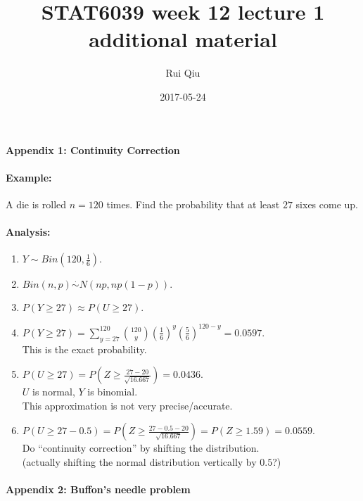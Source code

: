 \documentclass[a4paper, 11pt, twoside]{article}
\begin{document}
\title{STAT6039 week 12 lecture 1 additional material}
\author{Rui Qiu}
\date{2017-05-24}

\maketitle

\paragraph{Appendix 1: Continuity Correction}

\paragraph{Example:} A die is rolled $n=120$ times. Find the probability that at least $27$ sixes come up.

\paragraph{Analysis:}

\begin{enumerate}
	\item $Y\sim Bin(120, \frac{1}{6}).$
	\item $Bin(n, p)\overset{\cdot}{\sim} N(np, np(1-p)).$
	\item $P(Y\geq 27)\approx P(U\geq 27).$
	\item $P(Y\geq 27)=\sum^{120}_{y=27}{120 \choose y}\left(\frac{1}{6}\right)^y\left(\frac{5}{6}\right)^{120-y}=0.0597.$\\
	This is the exact probability.
	\item $P(U\geq 27)=P\left(Z\geq \frac{27-20}{\sqrt{16.667}}\right)=0.0436.$\\
	$U$ is normal, $Y$ is binomial.\\
	This approximation is not very precise/accurate.
	\item $P(U\geq 27-0.5) = P\left(Z \geq \frac{27-0.5-20}{\sqrt{16.667}}\right) = P(Z\geq 1.59) = 0.0559.$\\
	Do ``continuity correction'' by shifting the distribution.\\
	(actually shifting the normal distribution vertically by $0.5$?)
\end{enumerate}

\paragraph{Appendix 2: Buffon's needle problem}
\end{document}
